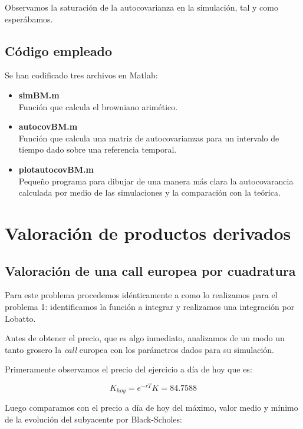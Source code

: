 \documentclass[a4paper,11pt]{article}
\begin{document}
Observamos la saturaci\'on de la autocovarianza en la simulaci\'on, tal y como
esper\'abamos.

\subsection{C\'odigo empleado}

Se han codificado tres archivos en Matlab:
\begin{itemize}
   \item \textbf{simBM.m}\\
      Funci\'on que calcula el browniano arim\'etico.
   \item \textbf{autocovBM.m}\\
      Funci\'on que calcula una matriz de autocovarianzas para un intervalo de
      tiempo dado sobre una referencia temporal.
   \item \textbf{plotautocovBM.m}\\
      Peque\~no programa para dibujar de una manera m\'as clara la
      autocovarancia calculada por medio de las simulaciones y la comparaci\'on
      con la te\'orica.
\end{itemize}

\newpage
\mbox{}

\pagebreak
\section{Valoraci\'on de productos derivados}

\subsection{Valoraci\'on de una call europea por cuadratura}

Para este problema procedemos id\'enticamente a como lo realizamos para el
problema 1: identificamos la funci\'on a integrar y realizamos una integraci\'on
por Lobatto.

Antes de obtener el precio, que es algo inmediato, analizamos de un
modo un tanto grosero la \textit{call} europea con los par\'ametros dados para
su simulaci\'on.

Primeramente observamos el precio del ejercicio a d\'ia de hoy que es:

\begin{equation*}
   K_{hoy} = e^{-rT}K = 84.7588
\end{equation*}

Luego comparamos con el precio a d\'ia de hoy del m\'aximo, valor
medio y m\'inimo de la evoluci\'on del subyacente por Black-Scholes:
\end{document}
